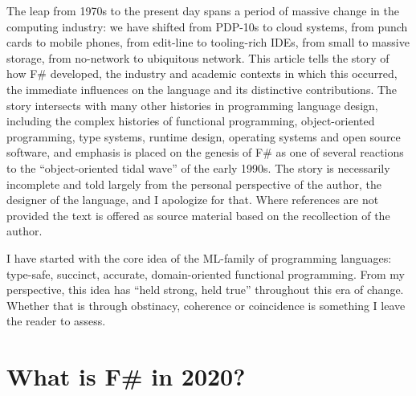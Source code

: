 \documentclass[acmsmall,review]{acmart}\settopmatter{printfolios=true,printccs=false,printacmref=false}
\begin{document}
The leap from 1970s to the present day spans a period of massive change in the computing industry: we have shifted from PDP-10s to cloud systems, from punch cards to mobile phones, from edit-line to tooling-rich IDEs, from small to massive storage, from no-network to ubiquitous network. This article tells the story of how F\# developed, the industry and academic contexts in which this occurred, the immediate influences on the language and its distinctive contributions. The story intersects with many other histories in programming language design, including the complex histories of functional programming, object-oriented programming, type systems, runtime design, operating systems and open source software, and emphasis is placed on the genesis of F\# as one of several reactions to the “object-oriented tidal wave” of the early 1990s.  The story is necessarily incomplete and told largely from the personal perspective of the author, the designer of the language, and I apologize for that. Where references are not provided the text is offered as source material based on the recollection of the author.

I have started with the core idea of the ML-family of programming languages: type-safe, succinct, accurate, domain-oriented functional programming. From my perspective, this idea has “held strong, held true” throughout this era of change. Whether that is through obstinacy, coherence or coincidence is something I leave the reader to assess. 

\section*{What is F\# in 2020?}
\end{document}
